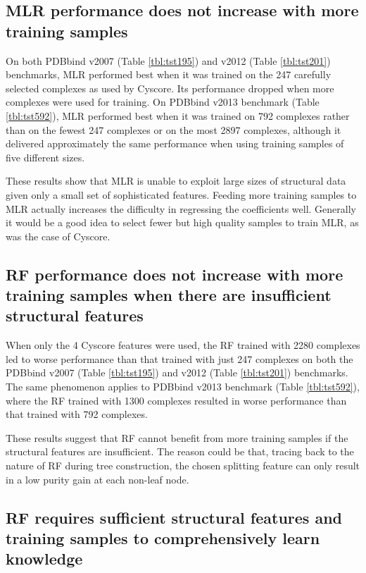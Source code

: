 \documentclass[journal=jacsat,manuscript=article]{achemso}
\begin{document}
\subsection{MLR performance does not increase with more training samples}

On both PDBbind v2007 (Table \ref{tbl:tst195}) and v2012 (Table \ref{tbl:tst201}) benchmarks, MLR performed best when it was trained on the 247 carefully selected complexes as used by Cyscore. Its performance dropped when more complexes were used for training. On PDBbind v2013 benchmark (Table \ref{tbl:tst592}), MLR performed best when it was trained on 792 complexes rather than on the fewest 247 complexes or on the most 2897 complexes, although it delivered approximately the same performance when using training samples of five different sizes.

These results show that MLR is unable to exploit large sizes of structural data given only a small set of sophisticated features. Feeding more training samples to MLR actually increases the difficulty in regressing the coefficients well. Generally it would be a good idea to select fewer but high quality samples to train MLR, as was the case of Cyscore.

\subsection{RF performance does not increase with more training samples when there are insufficient structural features}

When only the 4 Cyscore features were used, the RF trained with 2280 complexes led to worse performance than that trained with just 247 complexes on both the PDBbind v2007 (Table \ref{tbl:tst195}) and v2012 (Table \ref{tbl:tst201}) benchmarks. The same phenomenon applies to PDBbind v2013 benchmark (Table \ref{tbl:tst592}), where the RF trained with 1300 complexes resulted in worse performance than that trained with 792 complexes.

These results suggest that RF cannot benefit from more training samples if the structural features are insufficient. The reason could be that, tracing back to the nature of RF during tree construction, the chosen splitting feature can only result in a low purity gain at each non-leaf node.

\subsection{RF requires sufficient structural features and training samples to comprehensively learn knowledge}
\end{document}
